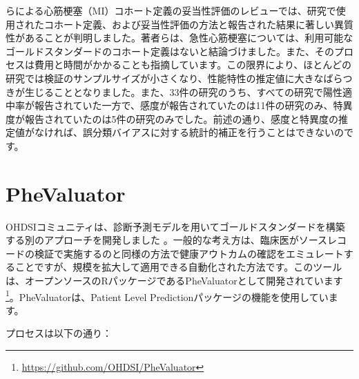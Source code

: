 \documentclass[
  11pt]{book}
\theoremstyle{definition}
\theoremstyle{definition}
\theoremstyle{definition}
\theoremstyle{definition}
\theoremstyle{remark}
\begin{document}
\citet{Rubbo2015phenotypes} らによる心筋梗塞（MI）コホート定義の妥当性評価のレビューでは、研究で使用されたコホート定義、および妥当性評価の方法と報告された結果に著しい異質性があることが判明しました。著者らは、急性心筋梗塞については、利用可能なゴールドスタンダードのコホート定義はないと結論づけました。また、そのプロセスは費用と時間がかかることも指摘しています。この限界により、ほとんどの研究では検証のサンプルサイズが小さくなり、性能特性の推定値に大きなばらつきが生じることとなりました。また、33件の研究のうち、すべての研究で陽性適中率が報告されていた一方で、感度が報告されていたのは11件の研究のみ、特異度が報告されていたのは5件の研究のみでした。前述の通り、感度と特異度の推定値がなければ、誤分類バイアスに対する統計的補正を行うことはできないのです。

\section{PheValuator}\label{phevaluator}


OHDSIコミュニティは、診断予測モデルを用いてゴールドスタンダードを構築する別のアプローチを開発しました \citep{Swerdel2019phevaluator} 。一般的な考え方は、臨床医がソースレコードの検証で実施するのと同様の方法で健康アウトカムの確認をエミュレートすることですが、規模を拡大して適用できる自動化された方法です。このツールは、オープンソースのRパッケージであるPheValuatorとして開発されています\footnote{\url{https://github.com/OHDSI/PheValuator}}。PheValuatorは、Patient Level Predictionパッケージの機能を使用しています。

プロセスは以下の通り：
\end{document}
